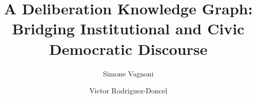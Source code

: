 \documentclass[runningheads]{llncs}  %
\begin{document}
\title {A Deliberation Knowledge Graph: Bridging Institutional and Civic Democratic Discourse} %


\author{Simone Vagnoni \and
Victor Rodriguez-Doncel
}



\maketitle
\end{document}

